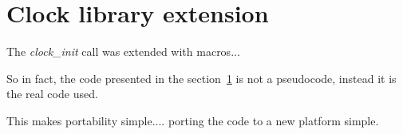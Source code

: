 
\section{Clock library extension}
The {\it{clock\_init}} call was extended with macros...

So in fact, the code presented in the section~\ref{}
is not a pseudocode, instead it is the real code used.

This makes portability simple.... porting the code to a new platform simple.

